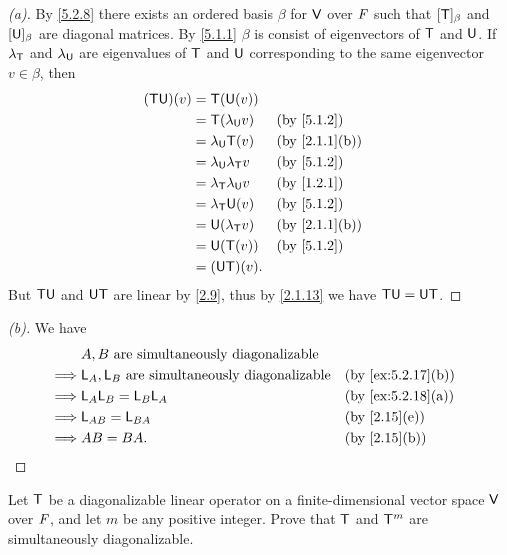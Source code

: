 \begin{proof}[(a)]
  By \cref{5.2.8} there exists an ordered basis \(\beta\) for \(\mathsf{V}\) over \(\mathit{F}\) such that \([\mathsf{T}]_{\beta}\) and \([\mathsf{U}]_{\beta}\) are diagonal matrices.
  By \cref{5.1.1} \(\beta\) is consist of eigenvectors of \(\mathsf{T}\) and \(\mathsf{U}\).
  If \(\lambda_{\mathsf{T}}\) and \(\lambda_{\mathsf{U}}\) are eigenvalues of \(\mathsf{T}\) and \(\mathsf{U}\) corresponding to the same eigenvector \(v \in \beta\), then
  \begin{align*}
    (\T \U)(v) & = \T(\U(v))                                      \\
               & = \T(\lambda_{\U} v)          &  & \by{5.1.2}    \\
               & = \lambda_{\U} \T(v)          &  & \by{2.1.1}[b] \\
               & = \lambda_{\U} \lambda_{\T} v &  & \by{5.1.2}    \\
               & = \lambda_{\T} \lambda_{\U} v &  & \by{1.2.1}    \\
               & = \lambda_{\T} \U(v)          &  & \by{5.1.2}    \\
               & = \U(\lambda_{\T} v)          &  & \by{2.1.1}[b] \\
               & = \U(\T(v))                   &  & \by{5.1.2}    \\
               & = (\U \T)(v).
  \end{align*}
  But \(\mathsf{T} \mathsf{U}\) and \(\mathsf{U} \mathsf{T}\) are linear by \cref{2.9}, thus by \cref{2.1.13} we have \(\mathsf{T} \mathsf{U} = \mathsf{U} \mathsf{T}\).
\end{proof}

\begin{proof}[(b)]
  We have
  \begin{align*}
             & A, B \text{ are simultaneously diagonalizable}                              \\
    \implies & \L_A, \L_B \text{ are simultaneously diagonalizable} &  & \by{ex:5.2.17}[b] \\
    \implies & \L_A \L_B = \L_B \L_A                                &  & \by{ex:5.2.18}[a] \\
    \implies & \L_{AB} = \L_{BA}                                    &  & \by{2.15}[e]      \\
    \implies & AB = BA.                                             &  & \by{2.15}[b]
  \end{align*}
\end{proof}

\begin{ex}\label{ex:5.2.19}
  Let \(\mathsf{T}\) be a diagonalizable linear operator on a finite-dimensional vector space \(\mathsf{V}\) over \(\mathit{F}\), and let \(m\) be any positive integer.
  Prove that \(\mathsf{T}\) and \(\mathsf{T}^m\) are simultaneously diagonalizable.
\end{ex}

